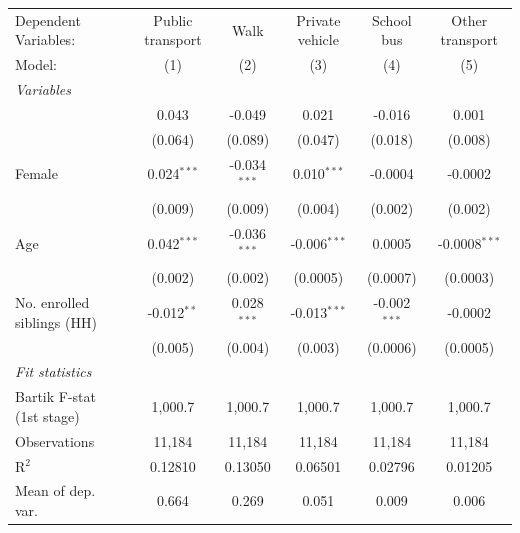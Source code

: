 \begin{tabular}{lccccc}
   \tabularnewline \midrule \midrule
   Dependent Variables:                                                  & Public transport & Walk           & Private vehicle & School bus     & Other transport\\  
   Model:                                                                & (1)              & (2)            & (3)             & (4)            & (5)\\  
   \midrule
   \emph{Variables}\\
        & 0.043            & -0.049         & 0.021           & -0.016         & 0.001\\   
                                                                         & (0.064)          & (0.089)        & (0.047)         & (0.018)        & (0.008)\\   
   Female                                                                & 0.024$^{***}$    & -0.034$^{***}$ & 0.010$^{***}$   & -0.0004        & -0.0002\\   
                                                                         & (0.009)          & (0.009)        & (0.004)         & (0.002)        & (0.002)\\   
   Age                                                                   & 0.042$^{***}$    & -0.036$^{***}$ & -0.006$^{***}$  & 0.0005         & -0.0008$^{***}$\\   
                                                                         & (0.002)          & (0.002)        & (0.0005)        & (0.0007)       & (0.0003)\\   
   No. enrolled siblings (HH)                                            & -0.012$^{**}$    & 0.028$^{***}$  & -0.013$^{***}$  & -0.002$^{***}$ & -0.0002\\   
                                                                         & (0.005)          & (0.004)        & (0.003)         & (0.0006)       & (0.0005)\\   
   \midrule
   \emph{Fit statistics}\\
   Bartik F-stat (1st stage)                                     & 1,000.7          & 1,000.7        & 1,000.7         & 1,000.7        & 1,000.7\\  
   Observations                                                          & 11,184           & 11,184         & 11,184          & 11,184         & 11,184\\  
   R$^2$                                                                 & 0.12810          & 0.13050        & 0.06501         & 0.02796        & 0.01205\\  
   Mean of dep. var.                                                     & 0.664            & 0.269          & 0.051           & 0.009          & 0.006\\  
\bottomrule
\end{tabular}

